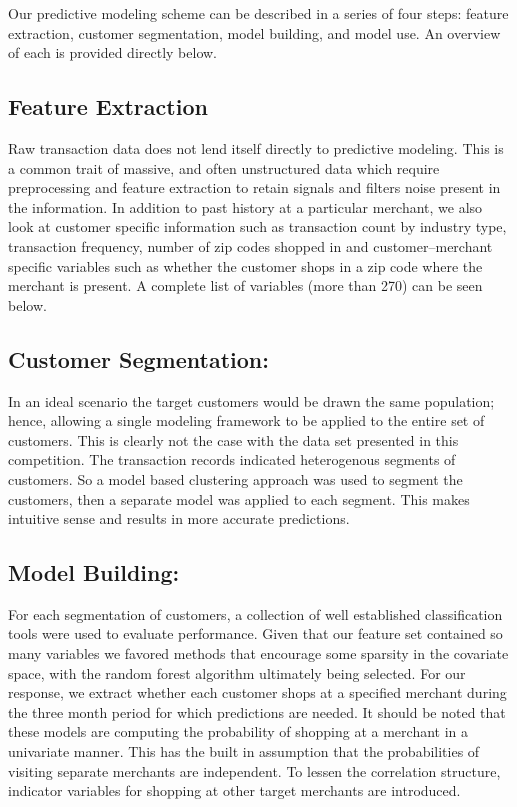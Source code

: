 \documentclass[12pt]{article} %
\begin{document}
Our predictive modeling scheme can be described in a series of four steps: feature extraction, customer segmentation, model building, and model use.  An overview of each is provided directly below.
\subsection*{Feature Extraction} 
Raw transaction data does not lend itself directly to predictive modeling.  This is a common trait of massive, and often unstructured data which require preprocessing and feature extraction to retain signals and filters noise present in the information.  In addition to past history at a particular merchant, we also look at customer specific information such as transaction count by industry type, transaction frequency, number of zip codes shopped in and customer--merchant specific variables such as whether the customer shops in a zip code where the merchant is present.  A complete list of variables (more than 270) can be seen below.  

\subsection*{Customer Segmentation:} 
In an ideal scenario the target customers would be drawn the same population; hence, allowing a single modeling framework to be applied to the entire set of customers.  This is clearly not the case with the data set presented in this competition.  The transaction records indicated  heterogenous segments of customers.  So a model based clustering approach was used to segment the customers, then a separate model was applied to each segment.  This makes intuitive sense and results in more accurate predictions. 

\subsection*{Model Building:} 
For each segmentation of customers, a collection of well established classification tools were used to evaluate performance.  Given that our feature set contained so many variables we favored methods that encourage some sparsity in the covariate space, with the random forest algorithm ultimately being selected.  For our response, we extract whether each customer shops at a specified merchant during the three month period for which predictions are needed.  It should be noted that these models are computing the probability of shopping at a merchant in a univariate manner.  This has the built in assumption that the probabilities of visiting separate merchants are independent.  To lessen the correlation structure, indicator variables for shopping at other target merchants are introduced.
\end{document}
